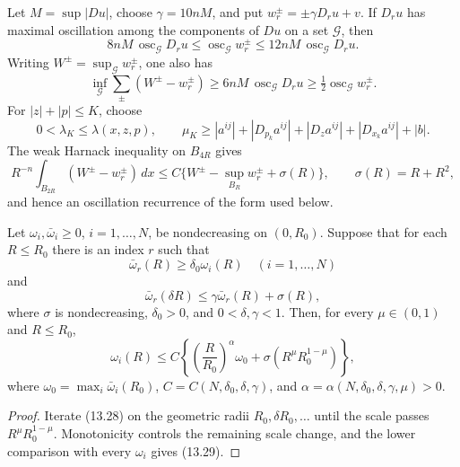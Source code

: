 Let $M=\sup|Du|$, choose $\gamma=10nM$, and put
$w_r^\pm=\pm\gamma D_ru+v$.  If $D_ru$ has maximal oscillation among the
components of $Du$ on a set $\mathcal G$, then
\begin{equation}
8nM\,\operatorname{osc}_{\mathcal G}D_ru
\le\operatorname{osc}_{\mathcal G}w_r^\pm
\le12nM\,\operatorname{osc}_{\mathcal G}D_ru.
\tag{13.24}
\end{equation}
Writing $W^\pm=\sup_{\mathcal G}w_r^\pm$, one also has
\begin{equation}
\inf_{\mathcal G}\sum_\pm(W^\pm-w_r^\pm)
\ge6nM\,\operatorname{osc}_{\mathcal G}D_ru
\ge\tfrac12\operatorname{osc}_{\mathcal G}w_r^\pm.
\tag{13.25}
\end{equation}
For $|z|+|p|\le K$, choose
\begin{equation}
0<\lambda_K\le\lambda(x,z,p),\qquad
\mu_K\ge |a^{ij}|+|D_{p_k}a^{ij}|+|D_za^{ij}|+|D_{x_k}a^{ij}|+|b|.
\tag{13.26}
\end{equation}
The weak Harnack inequality on $B_{4R}$ gives
\begin{equation}
R^{-n}\int_{B_{2R}}(W^\pm-w_r^\pm)\,dx
\le C\{W^\pm-\sup_{B_R}w_r^\pm+\sigma(R)\},
\qquad \sigma(R)=R+R^2,
\tag{13.27}
\end{equation}
and hence an oscillation recurrence of the form used below.

\begin{lemma}
\label{lem:gt13-holder-gradient-13-5}
Let $\omega_i,\bar\omega_i\ge0$, $i=1,\ldots,N$, be nondecreasing on
$(0,R_0)$.  Suppose that for each $R\le R_0$ there is an index $r$ such that
\[
\bar\omega_r(R)\ge\delta_0\omega_i(R)\quad(i=1,\ldots,N)
\]
and
\begin{equation}
\bar\omega_r(\delta R)\le\gamma\bar\omega_r(R)+\sigma(R),
\tag{13.28}
\end{equation}
where $\sigma$ is nondecreasing, $\delta_0>0$, and $0<\delta,\gamma<1$.
Then, for every $\mu\in(0,1)$ and $R\le R_0$,
\begin{equation}
\omega_i(R)\le C\left\{
\left(\frac R{R_0}\right)^\alpha\omega_0
+\sigma(R^\mu R_0^{1-\mu})\right\},
\tag{13.29}
\end{equation}
where $\omega_0=\max_i\bar\omega_i(R_0)$,
$C=C(N,\delta_0,\delta,\gamma)$, and
$\alpha=\alpha(N,\delta_0,\delta,\gamma,\mu)>0$.
\end{lemma}
\begin{proof}
\sketch Iterate \textup{(13.28)} on the geometric radii
$R_0,\delta R_0,\ldots$ until the scale passes
$R^\mu R_0^{1-\mu}$.  Monotonicity controls the remaining scale change, and
the lower comparison with every $\omega_i$ gives \textup{(13.29)}.
\end{proof}

